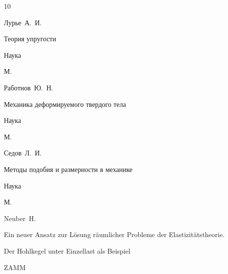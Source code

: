 \begin{thebibliography}{10}







\by Лурье~А.~И.

\book Теория упругости


\publ Наука

\publaddr М.













\by Работнов~Ю.~Н.

\book Механика деформируемого твердого тела


\publ Наука

\publaddr М.






\by Седов~Л.~И.

\book Методы подобия и размерности в механике


\publ Наука

\publaddr М.






\by Neuber~H.

\paper Ein neuer Ansatz zur L\"osung r\"aumlicher Probleme der Elastizit\"atstheorie. 

Der Hohlkegel unter Einzellast als Beispiel

\jour  ZAMM


\end{thebibliography}
